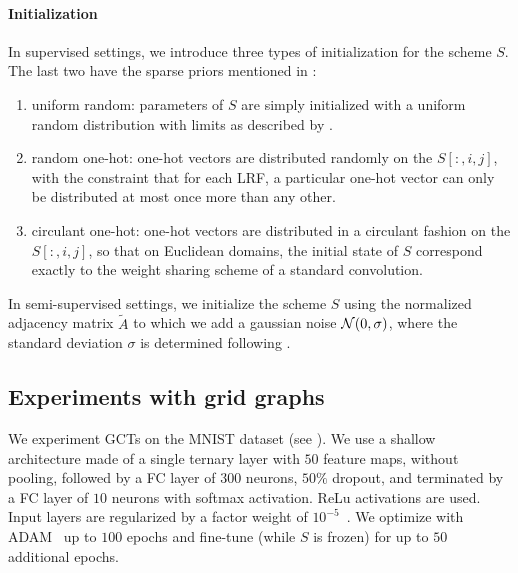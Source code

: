 \paragraph{Initialization}
In supervised settings, we introduce three types of initialization for the scheme $S$. The last two have the sparse priors mentioned in :
\begin{enumerate}
  \item uniform random: parameters of $S$ are simply initialized with a uniform random distribution with limits as described by \cite{glorot2010understanding}.
  \item random one-hot: one-hot vectors are distributed randomly on the $S[:,i,j]$, with the constraint that for each LRF, a particular one-hot vector can only be distributed at most once more than any other.
  \item circulant one-hot: one-hot vectors are distributed in a circulant fashion on the $S[:,i,j]$, so that on Euclidean domains, the initial state of $S$ correspond exactly to the weight sharing scheme of a standard convolution.
\end{enumerate}

In semi-supervised settings, we initialize the scheme $S$ using the normalized adjacency matrix $\widetilde{A}$ to which we add a gaussian noise $\mathcal{N}(0,\sigma)$, where the standard deviation $\sigma$ is determined following \cite{glorot2010understanding}.

\subsection{Experiments with grid graphs}

We experiment GCTs on the MNIST dataset (see ). We use a shallow architecture made of a single ternary layer with $50$ feature maps, without pooling, followed by a FC layer of $300$ neurons, $50\%$ dropout, and terminated by a FC layer of $10$ neurons with softmax activation. ReLu activations are used. Input layers are regularized by a factor weight of $10^{-5}$~\citep{ng2004feature}. We optimize with ADAM~\citep{kingma2014adam} up to $100$ epochs and fine-tune (while $S$ is frozen) for up to $50$ additional epochs.

